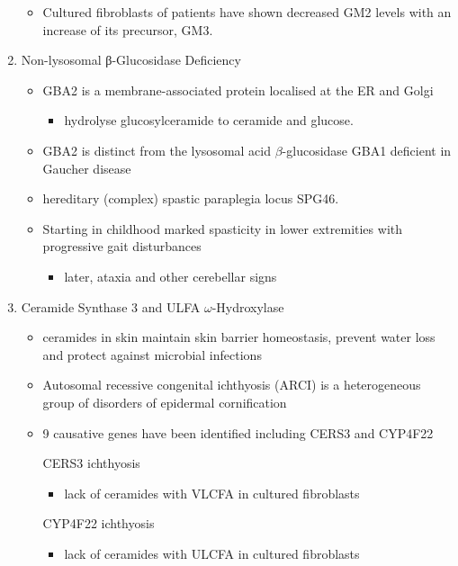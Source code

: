 \documentclass{scrartcl}
\begin{document}
\begin{enumerate}
\begin{itemize}
\item Cultured fibroblasts of patients have shown decreased GM2 levels
with an increase of its precursor, GM3.
\end{itemize}

\item Non-lysosomal β-Glucosidase Deficiency
\label{sec:orgb89411b}

\begin{itemize}
\item GBA2 is a membrane-associated protein localised at the ER and Golgi
\begin{itemize}
\item hydrolyse glucosylceramide to ceramide and glucose.
\end{itemize}
\item GBA2 is distinct from the lysosomal acid \(\beta\)-glucosidase GBA1 deficient in Gaucher disease
\item hereditary (complex) spastic paraplegia locus SPG46.
\item Starting in childhood marked spasticity in lower extremities with
progressive gait disturbances
\begin{itemize}
\item later, ataxia and other cerebellar signs
\end{itemize}
\end{itemize}

\item Ceramide Synthase 3 and ULFA \(\omega\)-Hydroxylase
\label{sec:org2550b85}

\begin{itemize}
\item ceramides in skin maintain skin barrier homeostasis, prevent water
loss and protect against microbial infections
\item Autosomal recessive congenital ichthyosis (ARCI) is a heterogeneous
group of disorders of epidermal cornification
\item 9 causative genes have been identified including CERS3 and CYP4F22

\item[{CERS3}] ichthyosis
\begin{itemize}
\item lack of ceramides with VLCFA in cultured fibroblasts
\end{itemize}
\item[{CYP4F22}] ichthyosis
\begin{itemize}
\item lack of ceramides with ULCFA in cultured fibroblasts
\end{itemize}
\end{itemize}
\end{enumerate}
\end{document}

